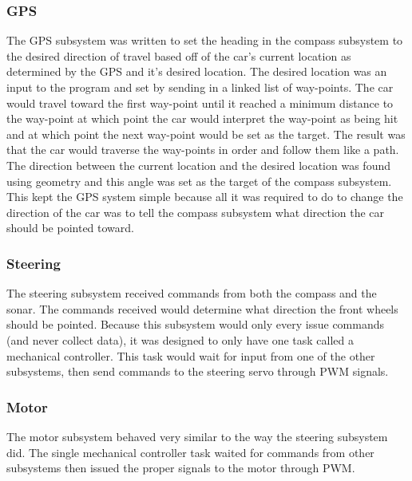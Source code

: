 \documentclass[final,letterpaper,singleside,12pt]{article}
\begin{document}
\subsubsection{GPS} %
\label{ssub:gps}
The GPS subsystem was written to set the heading in the compass subsystem to the desired direction of travel based off of the car's current location as determined by the GPS and it's desired location. The desired location was an input to the program and set by sending in a linked list of way-points. The car would travel toward the first way-point until it reached a minimum distance to the way-point at which point the car would interpret the way-point as being hit and at which point the next way-point would be set as the target. The result was that the car would traverse the way-points in order and follow them like a path. The direction between the current location and the desired location was found using geometry and this angle was set as the target of the compass subsystem. This kept the GPS system simple because all it was required to do to change the direction of the car was to tell the compass subsystem what direction the car should be pointed toward.

\subsubsection{Steering} %
\label{ssub:steering}
The steering subsystem received commands from both the compass and the sonar. The commands received would determine what direction the front wheels should be pointed. Because this subsystem would only every issue commands (and never collect data), it was designed to only have one task called a mechanical controller. This task would wait for input from one of the other subsystems, then send commands to the steering servo through PWM signals. 

\subsubsection{Motor} %
\label{ssub:motor}
The motor subsystem behaved very similar to the way the steering subsystem did. The single mechanical controller task waited for commands from other subsystems then issued the proper signals to the motor through PWM.


\pagebreak
\end{document}
